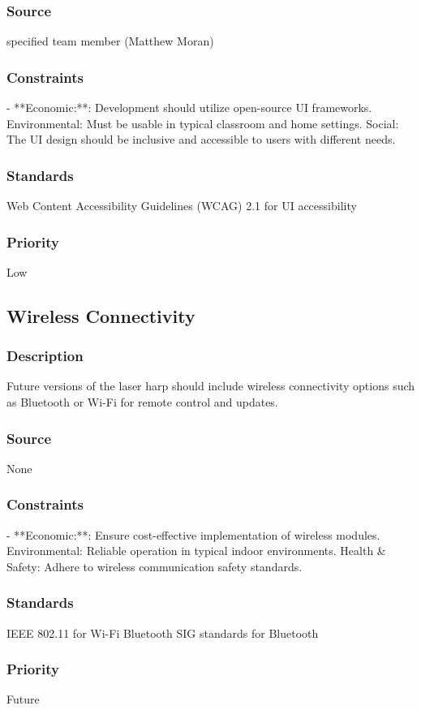 \subsubsection{Source}
specified team member (Matthew Moran)
\subsubsection{Constraints}
- **Economic:**: Development should utilize open-source UI frameworks.
Environmental: Must be usable in typical classroom and home settings.
Social: The UI design should be inclusive and accessible to users with different needs.
\subsubsection{Standards}
Web Content Accessibility Guidelines (WCAG) 2.1 for UI accessibility
\subsubsection{Priority}
Low


\subsection{Wireless Connectivity}
\subsubsection{Description}
Future versions of the laser harp should include wireless connectivity options such as Bluetooth or Wi-Fi for remote control and updates.
\subsubsection{Source}
None
\subsubsection{Constraints}
- **Economic:**: Ensure cost-effective implementation of wireless modules.
Environmental: Reliable operation in typical indoor environments.
Health & Safety: Adhere to wireless communication safety standards.
\subsubsection{Standards}
IEEE 802.11 for Wi-Fi
Bluetooth SIG standards for Bluetooth
\subsubsection{Priority}
Future
